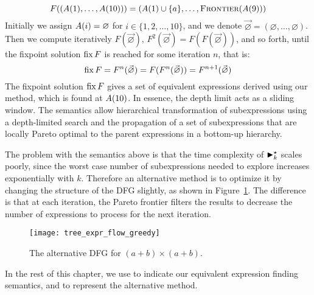 \begin{equation}
      F((A({1}), \ldots, A({10})))
    = (A({1}) \cup \{a\}, \ldots, \operatorname{\textsc{Frontier}}(A({9})))
    \label{so:eq:transfer_function}
\end{equation}
Initially we assign $A({i}) = \varnothing$ for $i\in\{1,2,\ldots,10\}$,
and we denote $\vec\varnothing = (\varnothing, \ldots, \varnothing)$.
Then we compute iteratively $F(\vec\varnothing)$, $F^2(\vec\varnothing) =
F(F(\vec\varnothing))$, and so forth, until the fixpoint solution $\operatorname{\mathrm{fix}} F$ is
reached for some iteration $n$, that is:
\begin{equation}
    \operatorname{\mathrm{fix}} F = F^n(\vec\varnothing) =
    F(F^n(\vec\varnothing)) = F^{n + 1}(\vec\varnothing)
\end{equation}
The fixpoint solution $\operatorname{\mathrm{fix}} F$ gives a set of equivalent expressions derived
using our method, which is found at $A({10})$. In essence, the depth limit
acts as a sliding window.  The semantics allow hierarchical transformation of
subexpressions using a depth-limited search and the propagation of a set of
subexpressions that are locally Pareto optimal to the parent expressions in a
bottom-up hierarchy.

The problem with the semantics above is that the time complexity of
$\operatorname{\blacktriangleright}^\star_k$ scales poorly, since the worst case number of subexpressions
needed to explore increases exponentially with $k$. Therefore an alternative
method is to optimize it by changing the structure of the DFG slightly, as
shown in Figure~\ref{so:fig:tree_expr_flow_greedy}. The difference is that at
each iteration, the Pareto frontier filters the results to decrease the number
of expressions to process for the next iteration.
\begin{figure}[ht]
    \centering
    \texttt{[image: tree\_expr\_flow\_greedy]}
    \caption{The alternative DFG for $(a + b) \times (a + b)$.
    }\label{so:fig:tree_expr_flow_greedy}
\end{figure}

In the rest of this chapter, we use \frontiertrace{} to indicate our equivalent
expression finding semantics, and \greedytrace{} to represent the alternative
method.
